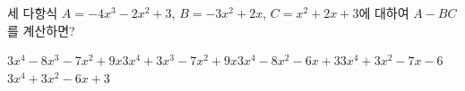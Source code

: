 세 다항식 $A=-4x^3-2x^2+3$, $B=-3x^2+2x$, $C=x^2+2x+3$에 대하여 $A-BC$를 계산하면?
\begin{choicesii}{$3x^4-8x^3-7x^2+9x$}{$3x^4+3x^3-7x^2+9x$}{$3x^4-8x^2-6x+3$}{$3x^4+3x^2-7x-6$}{$3x^4+3x^2-6x+3$}\end{choicesii}
